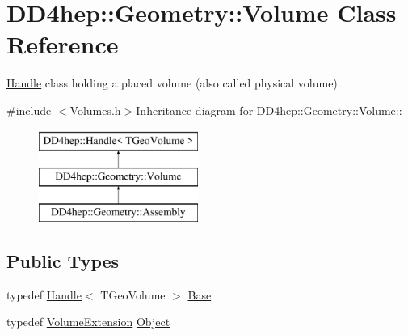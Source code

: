 \hypertarget{class_d_d4hep_1_1_geometry_1_1_volume}{
\section{DD4hep::Geometry::Volume Class Reference}
\label{class_d_d4hep_1_1_geometry_1_1_volume}
}


\hyperlink{class_d_d4hep_1_1_handle}{Handle} class holding a placed volume (also called physical volume).  


{\ttfamily \#include $<$Volumes.h$>$}Inheritance diagram for DD4hep::Geometry::Volume::\begin{figure}[H]
\begin{center}
\leavevmode
\includegraphics[height=3cm]{class_d_d4hep_1_1_geometry_1_1_volume}
\end{center}
\end{figure}
\subsection*{Public Types}
\begin{DoxyCompactItemize}
\item 
typedef \hyperlink{class_d_d4hep_1_1_handle}{Handle}$<$ TGeoVolume $>$ \hyperlink{class_d_d4hep_1_1_geometry_1_1_volume_ac9545eb97e81ed894b7192a26e4ef5a9}{Base}
\item 
typedef \hyperlink{class_d_d4hep_1_1_geometry_1_1_volume_extension}{VolumeExtension} \hyperlink{class_d_d4hep_1_1_geometry_1_1_volume_a12968f95257e99e277f773ccf6d58ee5}{Object}
\end{DoxyCompactItemize}

